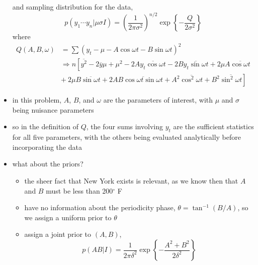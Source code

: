 \documentclass[../jaynes_prob_theory_notes.tex]{subfiles}
\begin{document}
\begin{itemize}
                    and sampling distribution for the data,
                    \begin{equation*} 
                        p(y_1 \cdots y_n | \mu \sigma I) = {\left( \frac{1}{2\pi\sigma^2} \right)}^{n/2} \exp \left \{ - \frac{Q}{2\sigma^2} \right \}
                    \end{equation*}
                    where 
                    \begin{equation*} 
                    \begin{split}
                        Q(A,B,\omega) &= \sum {(y_t - \mu - A\cos \omega t - B \sin \omega t)}^2 \\
                                      &\Rightarrow n \left[ \overline{y^2} - 2 \overline{y} \mu + \mu^2 - 2A\overline{y_t \cos \omega t} - 2B\overline{y_t \sin \omega t} + 2\mu A \overline{\cos \omega t} \right.\\
                                      &\left. +~2\mu B \overline{\sin \omega t} + 2AB\overline{\cos \omega t \sin \omega t} + A^2\overline{\cos^2\omega t} + B^2\overline{\sin^2 \omega t} \right]
                    \end{split}
                    \end{equation*}
                \item in this problem, \(A\), \(B\), and \(\omega\) are the parameters of interest, with \(\mu\) and \(\sigma\) being nuisance parameters
                \item so in the definition of \(Q\), the four sums involving \(y_t\) are the sufficient statistics for all five parameters, with the others being evaluated analytically before incorporating the data
                \item what about the priors?
                    \begin{itemize} 
                        \item the sheer fact that New York exists is relevant, as we know then that \(A\) and \(B\) must be less than 200\(^{\circ}\) F
                        \item have no information about the periodicity phase, \(\theta = \tan^{-1} (B/A)\), so we assign a uniform prior to \(\theta\)
                        \item assign a joint prior to \((A,B)\),
                            \begin{equation*} 
                                p(AB|I) = \frac{1}{2\pi{\delta}^2} \exp \left \{ -\frac{A^2 + B^2}{2\delta^2} \right \}
                            \end{equation*}

\end{itemize}
\end{itemize}
\end{document}

